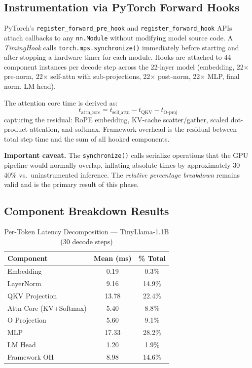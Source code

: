 \documentclass[conference]{IEEEtran}
\begin{document}
\subsection{Instrumentation via PyTorch Forward Hooks}

PyTorch's \texttt{register\_forward\_pre\_hook} and
\texttt{register\_forward\_hook} APIs attach callbacks to any
\texttt{nn.Module} without modifying model source code. A
\textit{TimingHook} calls \texttt{torch.mps.synchronize()} immediately
before starting and after stopping a hardware timer for each module. Hooks
are attached to 44 component instances per decode step across the 22-layer
model (embedding, 22$\times$ pre-norm, 22$\times$ self-attn with
sub-projections, 22$\times$ post-norm, 22$\times$ MLP, final norm, LM
head).

The attention core time is derived as:
\begin{equation}
  t_{\mathrm{attn\_core}} = t_{\mathrm{self\_attn}} - t_{\mathrm{QKV}} - t_{\mathrm{O\text{-}proj}}
\end{equation}
capturing the residual: RoPE embedding, KV-cache scatter/gather, scaled
dot-product attention, and softmax. Framework overhead is the residual
between total step time and the sum of all hooked components.

\textbf{Important caveat.} The \texttt{synchronize()} calls serialize
operations that the GPU pipeline would normally overlap, inflating absolute
times by approximately 30--40\% vs.\ uninstrumented inference. The
\textit{relative percentage breakdown} remains valid and is the primary
result of this phase.

\subsection{Component Breakdown Results}

\begin{table}[!t]
  \centering
  \caption{Per-Token Latency Decomposition --- TinyLlama-1.1B (30 decode steps)}
  \label{tab:decomp}
  \begin{tabular}{lcc}
    \toprule
    \textbf{Component} & \textbf{Mean (ms)} & \textbf{\% Total} \\
    \midrule
    Embedding              & 0.19  & 0.3\%  \\
    LayerNorm              & 9.16  & 14.9\% \\
    QKV Projection         & 13.78 & 22.4\% \\
    Attn Core (KV+Softmax) & 5.40  & 8.8\%  \\
    O Projection           & 5.60  & 9.1\%  \\
    MLP                    & 17.33 & 28.2\% \\
    LM Head                & 1.20  & 1.9\%  \\
    Framework OH           & 8.98  & 14.6\% \\
    \bottomrule
  \end{tabular}
\end{table}
\end{document}
